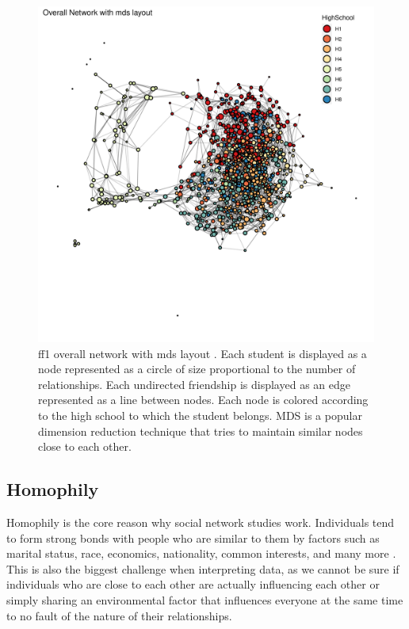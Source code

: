     \begin{figure}[ht!]
        \centering
            \includegraphics[width=0.9\linewidth]{figures/Networks/Layouts/Graph_OverallNetwork_with_no_highlight_mds_HighSchool___mds.png} 
        \caption{\gls{ff1} overall network with \gls{mds} layout \cite{Buja2008}. Each student is displayed as a node represented as a circle of size proportional to the number of relationships. Each undirected friendship is displayed as an edge represented as a line between nodes. Each node is colored according to the high school to which the student belongs. MDS is a popular dimension reduction technique that tries to maintain similar nodes close to each other.}
        \label{figure:networksLayoutsMDS}
    \end{figure} 


\subsection{Homophily}
\label{network:homophily}

Homophily is the core reason why social network studies work. Individuals tend to form strong bonds with people who are similar to them by factors such as marital status, race, economics, nationality, common interests, and many more \cite{Stehl2013, Moody2001, Qian2007, Cheadle2012, McPherson1987, Sergio2009, Kossinets2009, McPherson2001, Smith2014, Karimi2018, Lee2019, Avin2020, Asikainen2020}. This is also the biggest challenge when interpreting data, as we cannot be sure if individuals who are close to each other are actually influencing each other or simply sharing an environmental factor that influences everyone at the same time to no fault of the nature of their relationships.

